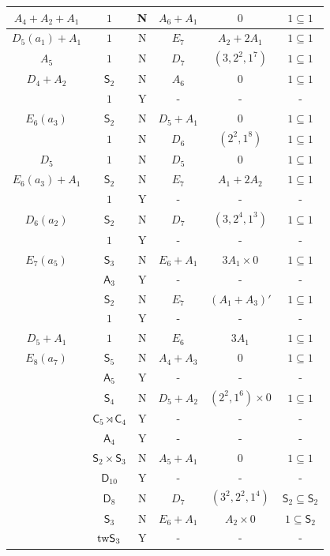 \documentclass[11pt]{amsart}
\newcommand{\Dih}{{\mathsf{D}}}
\newcommand{\Alt}{{\mathsf{A}}}
\newcommand{\Sym}{{\mathsf{S}}}
\newcommand{\Cyc}{{\mathsf{C}}}
\newcommand{\tw}{{{\mbox{\rm tw}}}}
\numberwithin{equation}{section}
\begin{document}
\begin{center}
\begin{longtable}{|c|c|c|c|c|c|}
			\hline
			$A_4+A_2+A_1$ & $1$ & N & $A_6 + A_1$ & $0$ & $1\subseteq 1$ \\
			\hline
			$D_5(a_1)+A_1$ & $1$ & N & $E_7$ & $A_2+2A_1$ & $1\subseteq 1$ \\
			\hline
			$A_5$ & $1$ & N & $D_7$ & $(3,2^2,1^7)$ & $1\subseteq 1$ \\
			\hline
			$D_4+A_2$ & $\Sym_2$ & N & $A_6$ & $0$ & $1\subseteq 1$ \\
			& $1$ & Y & - & - & - \\
			\hline
			$E_6(a_3)$ & $\Sym_2$ & N & $D_5 + A_1$ & $0$ & $1\subseteq 1$ \\
			& $1$ & N & $D_6$ & $(2^2,1^8)$ & $1\subseteq 1$ \\
			\hline
			$D_5$ & $1$ & N & $D_5$ & $0$ & $1\subseteq 1$ \\
			\hline
			$E_6(a_3)+A_1$ & $\Sym_2$ & N & $E_7$ & $A_1+2A_2$ & $1\subseteq 1$ \\
			& $1$ & Y & - & - & - \\
			\hline
			$D_6(a_2)$ & $\Sym_2$ & N & $D_7$ & $(3,2^4,1^3)$ & $1\subseteq 1$ \\
			& $1$ & Y & - & - & - \\
			\hline
			$E_7(a_5)$ & $\Sym_3$ & N & $E_6+A_1$ & $3A_1\times 0$ & $1\subseteq 1$ \\
			& $\Alt_3$ & Y & - & - & - \\
			& $\Sym_2$ & N & $E_7$ & $(A_1+A_3)'$ & $1\subseteq 1$ \\
			& $1$ & Y & - & - & - \\
			\hline
			$D_5+A_1$ & $1$ & N & $E_6$ & $3A_1$ & $1\subseteq 1$ \\
			\hline
			$E_8(a_7)$ & $\Sym_5$ & N & $A_4 + A_3$ & $0$ & $1\subseteq 1$ \\
			& $\Alt_5$ & Y & - & - & - \\
			& $\Sym_4$ & N & $D_5 + A_2$ & $(2^2,1^6)\times 0$ & $1\subseteq 1$ \\
			& $\Cyc_5\rtimes \Cyc_4$ & Y & - & - & - \\
			& $\Alt_4$ & Y & - & - & - \\
			& $\Sym_2\times \Sym_3$ & N & $A_5 + A_1$ & $0$ & $1\subseteq 1$\\
			& $\Dih_{10}$ & Y & - & - & - \\
			& $\Dih_8$ & N & $D_7$ & $(3^2,2^2,1^4)$ & $\Sym_2\subseteq \Sym_2$ \\
			& $\Sym_3$ & N & $E_6 + A_1$ & $A_2\times 0$ & $1\subseteq \Sym_2$ \\
			& $\tw \Sym_3$ & Y & - & - & - \\

\end{longtable}
\end{center}
\end{document}
